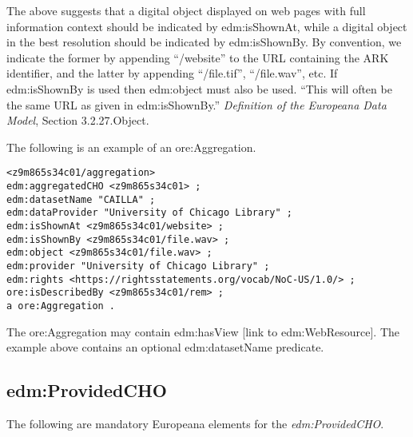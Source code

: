 \documentclass[11pt]{article}
\begin{document}
The above suggests that a digital object displayed on web pages with full information context should be indicated by edm:isShownAt, while a digital object in the best resolution should be indicated by edm:isShownBy. By convention, we indicate the former by appending ``/website'' to the URL containing the ARK identifier, and the latter by appending ``/file.tif'', ``/file.wav'', etc. If edm:isShownBy is used then edm:object must also be used. ``This will often be the same URL as given in edm:isShownBy.'' \textit{Definition of the Europeana Data Model}, Section 3.2.27.Object.


The following is an example of an ore:Aggregation.

\begin{verbatim}
<z9m865s34c01/aggregation>
edm:aggregatedCHO <z9m865s34c01> ;
edm:datasetName "CAILLA" ;
edm:dataProvider "University of Chicago Library" ;
edm:isShownAt <z9m865s34c01/website> ;
edm:isShownBy <z9m865s34c01/file.wav> ;
edm:object <z9m865s34c01/file.wav> ;
edm:provider "University of Chicago Library" ;
edm:rights <https://rightsstatements.org/vocab/NoC-US/1.0/> ;
ore:isDescribedBy <z9m865s34c01/rem> ;
a ore:Aggregation .
\end{verbatim}  

The ore:Aggregation may contain edm:hasView [link to edm:WebResource]. The example above contains an optional edm:datasetName predicate.

\subsection{edm:ProvidedCHO}
The following are mandatory Europeana elements for the \textit{edm:ProvidedCHO}.
\end{document}
